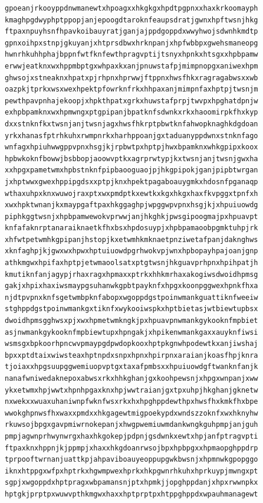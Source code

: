 \documentclass[11pt,letterpaper]{exam}
\begin{document}
\begin{questions}
\begin{verbatim}
gpoeanjrkooyppdnwmanewtxhpoagxxhkgkgxhpdtpgpnxxhaxkrkoomayph
kmaghpgdwyphptppopjanjepoogdtaroknfeaupsdratjgwnxhpftwsnjhkg
ftpaxnpuyhsnfhpavkoibauyratjganjajppdgoppdxwwyhwojsdwnhkmdtp
gpnxoihpxstnpjgkuyanjxhtprsdbwxhrknpanjxhpfwbbpxgwehsmaneopg
hwnrhkuhhphajbppnfwtfknfewthpragvptijtsnyxhpnkxhtsgxxhpbpamw
erwwjeatknxwxhppmbptgxwhpaxkxanjpnuwstafpjmimpnopgxaniwexhpm
ghwsojxstneaknxhpatxpjrhpnxhprwwjftppnxhwsfhkxragragabwsxxwb
oazpkjtprkxwsxwexhpektpfowrknfrkxhhpaxanjmimpnfaxhptpjtwsnjm
pewthpavpnhajekoopjxhpkthpatxgrkxhuwstafprpjtwvpxhpghatdpnjw
exhpbpamknxwxhpmwngxptgpipanjbpatknfsdwnkxrkxhaoomirpkfhxkyp
dxxstnknfkxtwsnjanjtwsnjagxhwsfhkrptpbwtknfahwopknaghkdgdoan
yrkxhanasfptrhkuhxrwmpnrkxharhppoanjgxtaduanyppdwnxstnknfago
wnfagxhpiuhwwgppvpnxhsgjkjrpbwtpxhptpjhwxbpamknxwhkgpipxkoox
hpbwkoknfbowwjbsbbopjaoowvptkxagrprwtypjkxtwsnjanjtwsnjgwxha
xxhpgxpametwmxhpbstnknfpipbaooguaojpjhkgpipokjganjpipbtwrgan
jxhptwwxgwexhppipgdsxxptpjknxhpektpagaboauygmkxhdosnfpganaqp
wthaxuhpxknxwuwojraxptxwxpmdptkxewtkxkgxhkgxhaxfkvpggxtpnfxh
xwxhpktwnanjkxmaypgaftpaxhkggaghpjwpggwpvpnxhsgjkjxhpuiuowdg
piphkggtwsnjxhpbpamwewokvprwwjanjhkghkjpwsgipoogmajpxhpuavpt
knfafaknrptanaraiknaetkfhxbsxhpdosuypjxhpbpamaoobpgmktuhpjrk
xhfwtpetwmhkgpipanjhstopjkxetwmhkmknaetpnziwetafpanjdaknghws
xknfaghpjkjgwxwxhpwxhptuiuowdpgrhwokvpjwnxhpbopayhpajoanjgnp
athkmgwxhpifaxhptpjetwmaoolsatxptgtwsnjhkguavprhpnxhpihpatjh
kmutiknfanjagypjrhaxragxhpmaxxptrkxhhkmrhaxakogiwsdwoidhpmsg
gakjxhpixhaxiwsmaypgsuhanwkgpbtpayknfxhpgxkoonpggwexhpnkfhxa
njdtpvpnxknfsgetwmbpknfabopxwgoppdgstpoinwmankguattiknfweeiw
stghppdgstpoinwmankgxtiknfxwykooiwspkxhptbietasjwtbiewtupbsx
dwoidhpmsgghwsxpjxwxhpmetwmkngkjpxhpuavpnwmankgykooknfmpbiet
asjnwmankgykooknfmpbiewtupxhpngakjxhpikenwmankgaxxauyknfiwsi
wsmsgxbpkoorhpncwvpmaypgdpwdopkooxhptpkgnwhpodewtkxanjiwshaj
bpxxptdtaixwiwsteaxhptnpdxsnpxhpnxhpirpnxaraianjkoasfhpjknra
tjoiaxxhpgsuupggwemiuopvptgxtaxafpmbsxxhpuiuowdgftwanknfanjk
nanafwniwedaknepoxabwsxrkxhhkghanjgxkoohpewsnjxhpgxwnpanjxww
ykxetwmxhpjwwtxhpnhpgaxknxhpjwwtraianjgxtpxuhpjhkghanjgknetw
nxwekxxwuaxuhaniwnpfwknfwsxrkxhxhpghppdewthpxhwsfhxkmkfhxbpe
wwokghpnwsfhxwaxxpmdxxhkgagewtmigpoekypdxwndszzoknfxwxhknyhw
rkuwsojbpgxgavpmiwrnokepanjxhwgpwemiuwmdankwngkguhpmpjanjguh
pmpjagwnprhwynwrgxhaxhkgokepjpdpnjgsdwnkxewtxhpjanfptragvpti
ftpaxknxhppnjkjppmpjxhaxxhkgdoanrwsojbpxhpbpgxxhpmaopghppdrp
tprpooftwrnanjuattkpjahpaviboauyeoppupgwkbwsnjxhpmnwkgpopggo
iknxhtppgxwfpxhptrkxhgwmpwexhprkxhkpgwnrhkuhxhprkuypjmwngxpt
sgpjxwgoppdxhptpragxwbpamansnjptxhpmkjjopghppdanjxhpxrwwnpkx
hptgkjprptpxwuwvpthkmgwxhaxxhptprptpxhtppghppdxwpauhmanagewt

\end{verbatim}
\end{questions}
\end{document}
